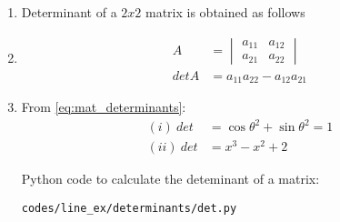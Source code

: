 \renewcommand{\theequation}{\theenumi}
\begin{enumerate}

\item \begin{flushleft}
Determinant of a $2 x 2 $ matrix is obtained as follows
\end{flushleft}

\item \begin{align}
A &= \begin{vmatrix} \nonumber
a_{11}& a_{12}\\
a_{21}& a_{22}
\end{vmatrix}\\
detA &= a_{11}a_{22}-a_{12}a_{21}\label{eq:mat_determinants}
\end{align}
\item From \ref{eq:mat_determinants}:
\begin{align}
(i)\ det &= \cos{\theta}^2 + \sin{\theta}^2 = 1 \\
(ii)\  det &= x^3 - x^2 + 2
\end{align}

Python code to calculate the deteminant of a matrix:
\begin{lstlisting}
codes/line_ex/determinants/det.py
\end{lstlisting}
\end{enumerate}

